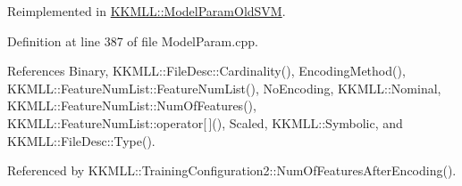 Reimplemented in \hyperlink{class_k_k_m_l_l_1_1_model_param_old_s_v_m_a77c29c4bb2a1e81788a674aa9c445395}{K\+K\+M\+L\+L\+::\+Model\+Param\+Old\+S\+VM}.



Definition at line 387 of file Model\+Param.\+cpp.



References Binary, K\+K\+M\+L\+L\+::\+File\+Desc\+::\+Cardinality(), Encoding\+Method(), K\+K\+M\+L\+L\+::\+Feature\+Num\+List\+::\+Feature\+Num\+List(), No\+Encoding, K\+K\+M\+L\+L\+::\+Nominal, K\+K\+M\+L\+L\+::\+Feature\+Num\+List\+::\+Num\+Of\+Features(), K\+K\+M\+L\+L\+::\+Feature\+Num\+List\+::operator\mbox{[}$\,$\mbox{]}(), Scaled, K\+K\+M\+L\+L\+::\+Symbolic, and K\+K\+M\+L\+L\+::\+File\+Desc\+::\+Type().



Referenced by K\+K\+M\+L\+L\+::\+Training\+Configuration2\+::\+Num\+Of\+Features\+After\+Encoding().


